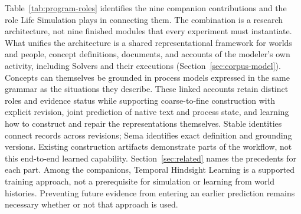 \documentclass[10pt]{article}
\begin{document}
Table~\ref{tab:program-roles} identifies the nine companion contributions and
the role Life Simulation plays in connecting them. The combination is a
research architecture, not nine finished modules that every experiment must
instantiate. What unifies the architecture is a shared representational
framework for worlds and people, concept definitions, documents, and accounts
of the modeler's own activity, including Solvers and their executions
(Section~\ref{sec:corpus-model}). Concepts can
themselves be grounded in process models expressed in the same grammar as the
situations they describe. These linked accounts retain distinct roles and
evidence status while supporting coarse-to-fine construction with explicit
revision, joint prediction of native text and process state, and learning how
to construct and repair the representations themselves. Stable identities
connect records across revisions; Sema identifies exact definition and
grounding versions. Existing
construction artifacts demonstrate parts of the workflow, not this end-to-end
learned capability. Section~\ref{sec:related} names the precedents for each
part. Among the companions, Temporal Hindsight Learning is a supported training
approach, not
a prerequisite for simulation or learning from world histories. Preventing
future evidence from entering an earlier prediction remains necessary whether
or not that approach is used.
\end{document}
